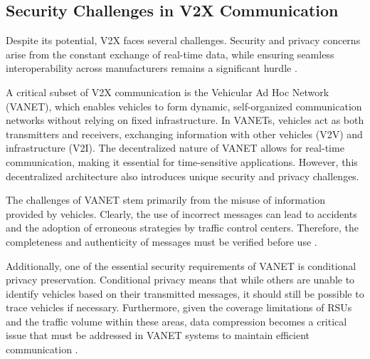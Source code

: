 \subsection{Security Challenges in V2X Communication}

Despite its potential, V2X faces several challenges. Security and privacy concerns arise from the constant exchange 
of real-time data, while ensuring seamless interoperability across manufacturers remains a significant hurdle \cite{zEslami}.

A critical subset of V2X communication is the Vehicular Ad Hoc Network (VANET), which enables vehicles to form dynamic,
 self-organized communication networks without relying on fixed infrastructure. In VANETs, vehicles act as both transmitters
  and receivers, exchanging information with other vehicles (V2V) and infrastructure (V2I). The decentralized nature of VANET allows for real-time 
  communication, making it essential for time-sensitive applications. However, this decentralized architecture also 
  introduces unique security and privacy challenges.

The challenges of VANET stem primarily from the misuse of information provided by vehicles. Clearly, the use of
 incorrect messages can lead to accidents and the adoption of erroneous strategies by traffic control centers. 
 Therefore, the completeness and authenticity of messages must be verified before use \cite{zEslami}.

Additionally, one of the essential security requirements of VANET is conditional privacy preservation. 
Conditional privacy means that while others are unable to identify vehicles based on their transmitted messages, 
it should still be possible to trace vehicles if necessary. Furthermore, given the coverage 
limitations of RSUs and the traffic volume within these areas, data compression becomes a critical
 issue that must be addressed in VANET systems to maintain efficient communication \cite{zEslami}.